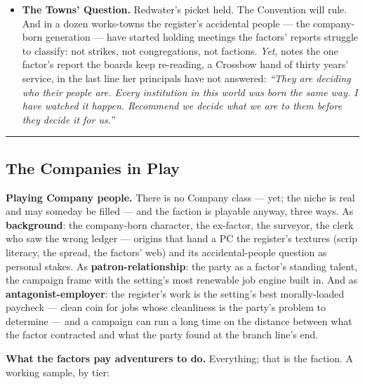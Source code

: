 \begin{itemize}
    \item \textbf{The Towns' Question.} Redwater's picket held. The Convention will rule. And in a dozen works-towns the register's accidental people --- the company-born generation --- have started holding meetings the factors' reports struggle to classify: not strikes, not congregations, not factions. \textit{Yet}, notes the one factor's report the boards keep re-reading, a Crossbow hand of thirty years' service, in the last line her principals have not answered: \textit{``They are deciding who their people are. Every institution in this world was born the same way. I have watched it happen. Recommend we decide what we are to them before they decide it for us.''}
\end{itemize}

\medskip\hrule\medskip

\subsection{The Companies in Play}

\textbf{Playing Company people.} There is no Company class --- yet; the niche is real and may someday be filled --- and the faction is playable anyway, three ways. As \textbf{background}: the company-born character, the ex-factor, the surveyor, the clerk who saw the wrong ledger --- origins that hand a PC the register's textures (scrip literacy, the spread, the factors' web) and its accidental-people question as personal stakes. As \textbf{patron-relationship}: the party as a factor's standing talent, the campaign frame with the setting's most renewable job engine built in. And as \textbf{antagonist-employer}: the register's work is the setting's best morally-loaded paycheck --- clean coin for jobs whose cleanliness is the party's problem to determine --- and a campaign can run a long time on the distance between what the factor contracted and what the party found at the branch line's end.

\textbf{What the factors pay adventurers to do.} Everything; that is the faction. A working sample, by tier:


